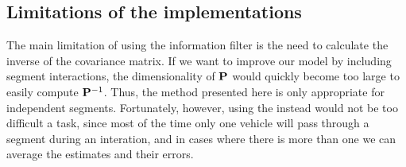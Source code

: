 \subsection{Limitations of the implementations}
\label{sec:kf-limits}

The main limitation of using the information filter is the need to calculate the inverse of the covariance matrix. If we want to improve our model by including segment interactions, the dimensionality of $\mathbf{P}$ would quickly become too large to easily compute $\mathbf{P}^{-1}$. Thus, the method presented here is only appropriate for independent segments. Fortunately, however, using the \kf{} instead would not be too difficult a task, since most of the time only one vehicle will pass through a segment during an interation, and in cases where there is more than one we can average the estimates and their errors.
